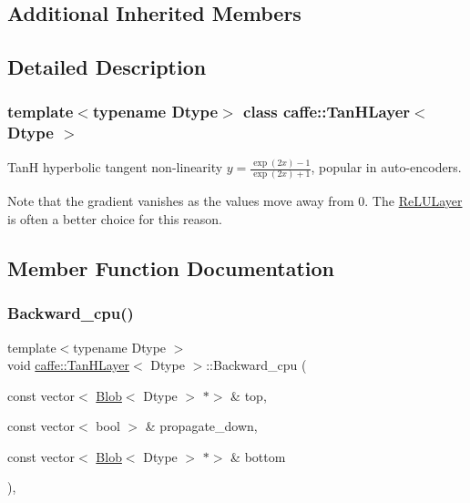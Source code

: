 \subsection*{Additional Inherited Members}


\subsection{Detailed Description}
\subsubsection*{template$<$typename Dtype$>$\newline
class caffe\+::\+Tan\+H\+Layer$<$ Dtype $>$}

TanH hyperbolic tangent non-\/linearity $ y = \frac{\exp(2x) - 1}{\exp(2x) + 1} $, popular in auto-\/encoders. 

Note that the gradient vanishes as the values move away from 0. The \mbox{\hyperlink{classcaffe_1_1_re_l_u_layer}{Re\+L\+U\+Layer}} is often a better choice for this reason. 

\subsection{Member Function Documentation}
\mbox{\label{classcaffe_1_1_tan_h_layer_a5406381416c42097befd8bf1922af12b}} 
\subsubsection{\texorpdfstring{Backward\+\_\+cpu()}{Backward\_cpu()}\hspace{0.1cm}{\footnotesize\ttfamily [1/2]}}
{\footnotesize\ttfamily template$<$typename Dtype $>$ \\
void \mbox{\hyperlink{classcaffe_1_1_tan_h_layer}{caffe\+::\+Tan\+H\+Layer}}$<$ Dtype $>$\+::Backward\+\_\+cpu (\begin{DoxyParamCaption}\item[{const vector$<$ \mbox{\hyperlink{classcaffe_1_1_blob}{Blob}}$<$ Dtype $>$ $\ast$$>$ \&}]{top,  }\item[{const vector$<$ bool $>$ \&}]{propagate\+\_\+down,  }\item[{const vector$<$ \mbox{\hyperlink{classcaffe_1_1_blob}{Blob}}$<$ Dtype $>$ $\ast$$>$ \&}]{bottom }\end{DoxyParamCaption})\hspace{0.3cm}{\ttfamily [protected]}, {\ttfamily [virtual]}}



